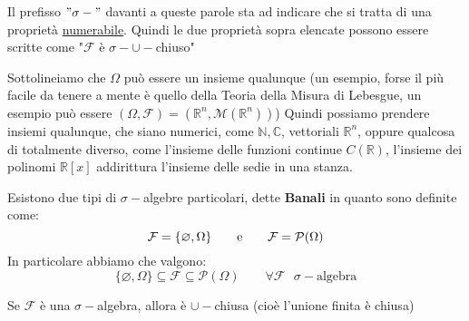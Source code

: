 \documentclass[11pt, a4paper, twoside]{article}
\begin{document}
Il prefisso $"\sigma-"$ davanti a queste parole sta ad indicare che si tratta di una proprietà \underline{numerabile}. Quindi le due proprietà sopra elencate possono essere scritte come "$\mathcal F$ è $\sigma-\cup-$chiuso"

\begin{oss}
	Sottolineiamo che $\Omega$ può essere un insieme qualunque (un esempio, forse il più facile da tenere a mente è quello della Teoria della Misura di Lebesgue, un esempio può essere $(\Omega, \mathcal F) = (\mathbb R^n, \mathcal M(\mathbb R^n))$) Quindi possiamo prendere insiemi qualunque, che siano numerici, come $\mathbb N, \mathbb C$, vettoriali $\mathbb R^n$, oppure qualcosa di totalmente diverso, come l'insieme delle funzioni continue $C(\mathbb R)$, l'insieme dei polinomi $\mathbb R[x]$ addirittura l'insieme delle sedie in una stanza.
\end{oss}

\begin{oss}
	Esistono due tipi di $\sigma-$algebre particolari, dette \textbf{Banali} in quanto sono definite come:
	\[ \mathcal F = \{\varnothing, \Omega\} \qquad \text e \qquad \mathcal F = \mathcal P(\Omega) \]
	In particolare abbiamo che valgono:
	\[ \{\varnothing, \Omega\} \subseteq \mathcal F \subseteq \mathcal P(\Omega) \qquad \forall \mathcal F \text{ }\sigma- \text{algebra}\]
\end{oss}

\begin{prop}{}{}
	Se $\mathcal F$ è una $\sigma-$algebra, allora è $\cup-$chiusa (cioè l'unione finita è chiusa)
\end{prop}
\end{document}
